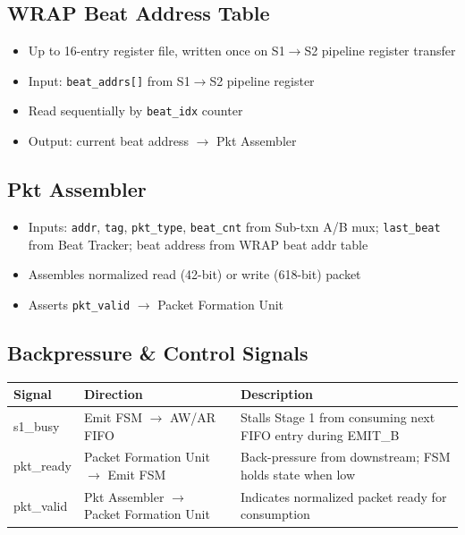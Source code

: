 \subsection{WRAP Beat Address Table}
\begin{itemize}[noitemsep]
  \item Up to 16-entry register file, written once on S1$\rightarrow$S2 pipeline register transfer
  \item Input: \texttt{beat\_addrs[]} from S1$\rightarrow$S2 pipeline register
  \item Read sequentially by \texttt{beat\_idx} counter
  \item Output: current beat address $\rightarrow$ Pkt Assembler
\end{itemize}

\subsection{Pkt Assembler}
\begin{itemize}[noitemsep]
  \item Inputs: \texttt{addr}, \texttt{tag}, \texttt{pkt\_type}, \texttt{beat\_cnt} from Sub-txn A/B mux; \texttt{last\_beat} from Beat Tracker; beat address from WRAP beat addr table
  \item Assembles normalized read (42-bit) or write (618-bit) packet
  \item Asserts \texttt{pkt\_valid} $\rightarrow$ Packet Formation Unit
\end{itemize}

\subsection{Backpressure \& Control Signals}

\begin{center}
\begin{tabularx}{\textwidth}{>{\ttfamily}l >{\ttfamily}l X}
\toprule
\textbf{Signal} & \textbf{Direction} & \textbf{Description} \\
\midrule
s1\_busy   & Emit FSM $\rightarrow$ AW/AR FIFO     & Stalls Stage 1 from consuming next FIFO entry during EMIT\_B \\
pkt\_ready & Packet Formation Unit $\rightarrow$ Emit FSM & Back-pressure from downstream; FSM holds state when low \\
pkt\_valid & Pkt Assembler $\rightarrow$ Packet Formation Unit & Indicates normalized packet ready for consumption \\
\bottomrule
\end{tabularx}
\end{center}

